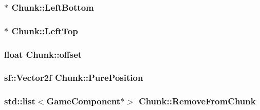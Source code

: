 \hypertarget{class_chunk_af3577f37139ffeb74181d9ce3c48f5e6}{
\subsubsection[{Left\-Bottom}]{$\ast$ Chunk\-::\-Left\-Bottom\hspace{0.3cm}{\ttfamily [private]}}}\label{class_chunk_af3577f37139ffeb74181d9ce3c48f5e6}
\hypertarget{class_chunk_a877d51226eaa97c40c05223987514d59}{
\subsubsection[{Left\-Top}]{$\ast$ Chunk\-::\-Left\-Top\hspace{0.3cm}{\ttfamily [private]}}}\label{class_chunk_a877d51226eaa97c40c05223987514d59}
\hypertarget{class_chunk_a6ab7f8f3970c886a62ccc1630bc60a16}{
\subsubsection[{offset}]{\setlength{\rightskip}{0pt plus 5cm}float Chunk\-::offset\hspace{0.3cm}{\ttfamily [private]}}}\label{class_chunk_a6ab7f8f3970c886a62ccc1630bc60a16}
\hypertarget{class_chunk_ace1577872b1189bc7fd88a9b3817ce98}{
\subsubsection[{Pure\-Position}]{\setlength{\rightskip}{0pt plus 5cm}sf\-::\-Vector2f Chunk\-::\-Pure\-Position\hspace{0.3cm}{\ttfamily [private]}}}\label{class_chunk_ace1577872b1189bc7fd88a9b3817ce98}
\hypertarget{class_chunk_adf6692fdab4518524e217cc0ef09d282}{
\subsubsection[{Remove\-From\-Chunk}]{\setlength{\rightskip}{0pt plus 5cm}std\-::list$<${\bf Game\-Component}$\ast$$>$ Chunk\-::\-Remove\-From\-Chunk\hspace{0.3cm}{\ttfamily [private]}}}\label{class_chunk_adf6692fdab4518524e217cc0ef09d282}
